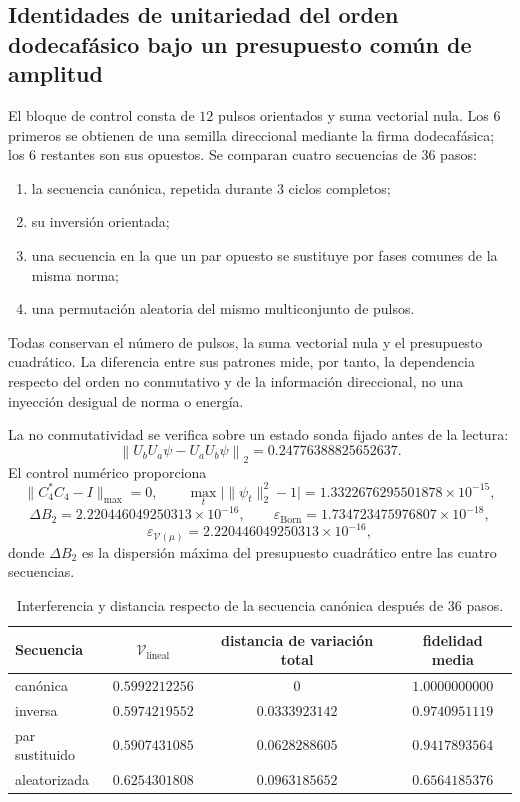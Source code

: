 \subsection{Identidades de unitariedad del orden dodecafásico bajo un presupuesto común de amplitud}

El bloque de control consta de \(12\) pulsos orientados y suma vectorial nula.
Los \(6\) primeros se obtienen de una semilla direccional mediante la firma
dodecafásica; los \(6\) restantes son sus opuestos. Se comparan cuatro
secuencias de \(36\) pasos:
\begin{enumerate}
 \item la secuencia canónica, repetida durante \(3\) ciclos completos;
 \item su inversión orientada;
 \item una secuencia en la que un par opuesto se sustituye por fases comunes
       de la misma norma;
 \item una permutación aleatoria del mismo multiconjunto de pulsos.
\end{enumerate}
Todas conservan el número de pulsos, la suma vectorial nula y el presupuesto
cuadrático. La diferencia entre sus patrones mide, por tanto, la dependencia
respecto del orden no conmutativo y de la información direccional, no una
inyección desigual de norma o energía.

La no conmutatividad se verifica sobre un estado sonda fijado antes de la
lectura:
\[
 \left\|U_bU_a\psi-U_aU_b\psi\right\|_2
 =0.24776388825652637.
\]
El control numérico proporciona
\[
 \|C_4^*C_4-I\|_{\max}=0,
 \qquad
 \max_t\bigl|\|\psi_t\|_2^2-1\bigr|
 =1.3322676295501878\times10^{-15},
\]
\[
 \Delta B_2=2.220446049250313\times10^{-16},
 \qquad
 \varepsilon_{\mathrm{Born}}
 =1.734723475976807\times10^{-18},
\]
\[
 \varepsilon_{\mathcal V(\mu)}
 =2.220446049250313\times10^{-16},
\]
donde \(\Delta B_2\) es la dispersión máxima del presupuesto cuadrático entre
las cuatro secuencias.

\begin{table}[tbp]
\centering
\caption{Interferencia y distancia respecto de la secuencia canónica después de \(36\) pasos.}
\label{tab:md-sucesora-interferometro-resultados}
\begin{tabular}{lccc}
\toprule
Secuencia & \(\mathcal V_{\mathrm{lineal}}\) &
distancia de variación total & fidelidad media \\
\midrule
canónica      & \(0.5992212256\) & \(0\)            & \(1.0000000000\) \\
inversa       & \(0.5974219552\) & \(0.0333923142\) & \(0.9740951119\) \\
par sustituido& \(0.5907431085\) & \(0.0628288605\) & \(0.9417893564\) \\
aleatorizada  & \(0.6254301808\) & \(0.0963185652\) & \(0.6564185376\) \\
\bottomrule
\end{tabular}
\end{table}


